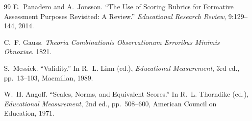 \documentclass[12pt,a4paper]{article}
\theoremstyle{remark}
\begin{document}
\begin{thebibliography}{99}
E.~Panadero and A.~Jonsson. ``The Use of Scoring Rubrics for Formative Assessment Purposes Revisited: A Review.'' \emph{Educational Research Review}, 9:129--144, 2014.

C.~F. Gauss. \emph{Theoria Combinationis Observationum Erroribus Minimis Obnoxiae}. 1821.

S.~Messick. ``Validity.'' In R.~L. Linn (ed.), \emph{Educational Measurement}, 3rd ed., pp.~13--103, Macmillan, 1989.

W.~H. Angoff. ``Scales, Norms, and Equivalent Scores.'' In R.~L. Thorndike (ed.), \emph{Educational Measurement}, 2nd ed., pp.~508--600, American Council on Education, 1971.

\end{thebibliography}
\end{document}
